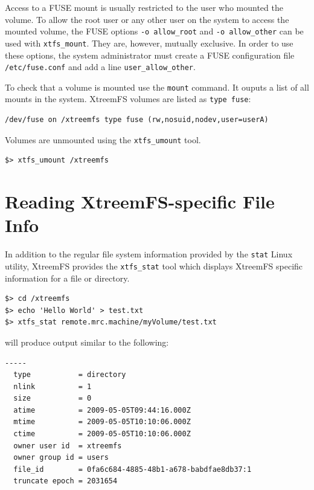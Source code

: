 \documentclass[a4paper,10pt]{book}
\begin{document}
Access to a FUSE mount is usually restricted to the user who mounted the volume. To allow the root user or any other user on the system to access the mounted volume, the FUSE options \texttt{-o allow\_root} and \texttt{-o allow\_other} can be used with \texttt{xtfs\_mount}. They are, however, mutually exclusive. In order to use these options, the system administrator must create a FUSE configuration file \texttt{/etc/fuse.conf} and add a line \texttt{user\_allow\_other}.

To check that a volume is mounted use the \texttt{mount} command. It ouputs a list of all mounts in the system. XtreemFS volumes are listed as \texttt{type fuse}:

\begin{verbatim}
/dev/fuse on /xtreemfs type fuse (rw,nosuid,nodev,user=userA)
\end{verbatim}

Volumes are unmounted using the \texttt{xtfs\_umount} tool.


\begin{verbatim}
$> xtfs_umount /xtreemfs
\end{verbatim}



\section{Reading XtreemFS-specific File Info}

In addition to the regular file system information provided by the \texttt{stat} Linux utility, XtreemFS provides the \texttt{xtfs\_stat} tool which displays XtreemFS specific information for a file or directory.


\begin{verbatim}
$> cd /xtreemfs
$> echo 'Hello World' > test.txt
$> xtfs_stat remote.mrc.machine/myVolume/test.txt
\end{verbatim}


will produce output similar to the following:


\begin{verbatim}
-----
  type           = directory
  nlink          = 1
  size           = 0
  atime          = 2009-05-05T09:44:16.000Z
  mtime          = 2009-05-05T10:10:06.000Z
  ctime          = 2009-05-05T10:10:06.000Z
  owner user id  = xtreemfs
  owner group id = users
  file_id        = 0fa6c684-4885-48b1-a678-babdfae8db37:1
  truncate epoch = 2031654
\end{verbatim}
\end{document}

